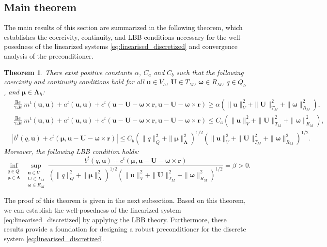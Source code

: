\documentclass{article}
\newcommand{\bU}{{\mathbf{U}}}
\newcommand{\bu}{{\mathbf{u}}}
\newcommand{\Reynolds}{{\operatorname{Re}}}
\newtheorem{theorem}{Theorem}[section]
\begin{document}
\subsection{Main theorem}
The main results of this section are summarized in the following theorem, which establishes the coercivity, continuity, and LBB conditions necessary for the well-posedness of the linearized systems \eqref{eq:linearised_discretized} and convergence analysis of the preconditioner.
\begin{theorem}\label{lem:coercivity_continuity}
    There exist positive constants $\alpha$, $C_a$ and $C_b$ such that the following coercivity and continuity conditions hold for all $\bu \in V_h$, $\bU \in T_M$, $\boldsymbol{\omega} \in R_M$, $q \in Q_h$, and $\boldsymbol{\mu} \in \boldsymbol{\Lambda}_h$:
    \begin{equation}
        \begin{aligned}
            &\frac{\Reynolds}{\gamma\Delta t} m^t(\bu,\bu) + a^t(\bu,\bu) + c^t(\bu - \bU - \boldsymbol{\omega}\times\mathbf{r}, \bu - \bU - \boldsymbol{\omega}\times\mathbf{r}) \geq \alpha \left( \|\bu\|_V^2 + \|\bU\|_{T_M}^2 + \|\boldsymbol{\omega}\|_{R_M}^2 \right), \\
            &\frac{\Reynolds}{\gamma\Delta t} m^t(\bu,\bu) + a^t(\bu,\bu) + c^t(\bu - \bU - \boldsymbol{\omega}\times\mathbf{r}, \bu - \bU - \boldsymbol{\omega}\times\mathbf{r}) \leq C_a \left( \|\bu\|_V^2 + \|\bU\|_{T_M}^2 + \|\boldsymbol{\omega}\|_{R_M}^2 \right), \\
            &\left| b^t(q, \bu) + c^t(\boldsymbol{\mu}, \bu - \bU - \boldsymbol{\omega}\times\mathbf{r}) \right| \leq C_b \left( \|q\|_Q^2 + \|\boldsymbol{\mu}\|_{\boldsymbol{\Lambda}}^2 \right)^{1/2} \left( \|\bu\|_V^2 + \|\bU\|_{T_M}^2 + \|\boldsymbol{\omega}\|_{R_M}^2 \right)^{1/2}.
        \end{aligned}
    \end{equation}
    Moreover, the following LBB condition holds:
    \begin{equation}
        \inf_{\substack{q \in Q \\ \boldsymbol{\mu} \in \boldsymbol{\Lambda}}} \sup_{\substack{\bu \in V \\ \bU \in T_M \\ \boldsymbol{\omega} \in R_M}} \frac{b^t(q, \bu) + c^t(\boldsymbol{\mu}, \bu - \bU - \boldsymbol{\omega}\times\mathbf{r})}{\left( \|q\|_Q^2 + \|\boldsymbol{\mu}\|_{\boldsymbol{\Lambda}}^2 \right)^{1/2} \left( \|\bu\|_V^2 + \|\bU\|_{T_M}^2 + \|\boldsymbol{\omega}\|_{R_M}^2 \right)^{1/2}} = \beta > 0.
    \end{equation}
\end{theorem}
The proof of this theorem is given in the next subsection. Based on this theorem, we can establish the well-posedness of the linearized system \eqref{eq:linearised_discretized} by applying the LBB theory. Furthermore, these results provide a foundation for designing a robust preconditioner for the discrete system \eqref{eq:linearised_discretized}.
\end{document}
